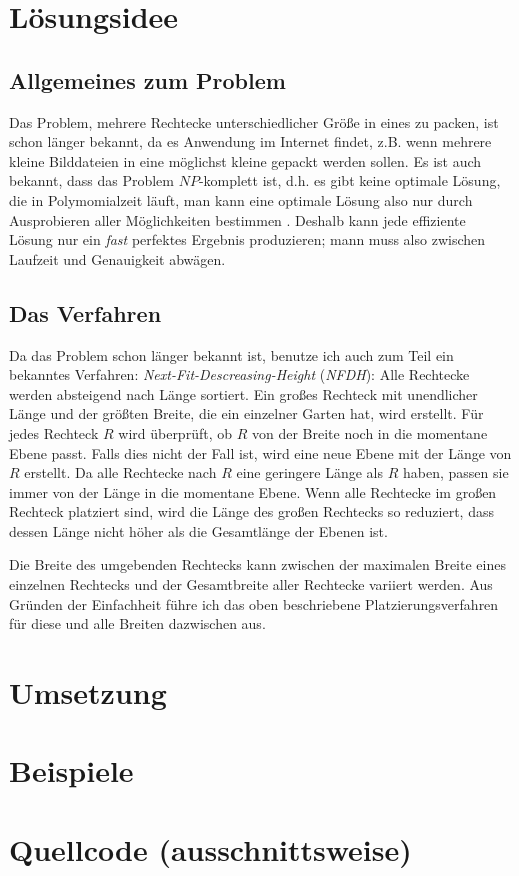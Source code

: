 \documentclass[a4paper,10pt,ngerman]{scrartcl}
\title{\Aufgabe}
\author{\Name\\Team-ID: \TeamId}
\date{\today}
\begin{document}
\maketitle
\tableofcontents
\clearpage


\section{Lösungsidee} 

\subsection{Allgemeines zum Problem}
Das Problem, mehrere Rechtecke unterschiedlicher Größe in eines zu packen, ist schon länger bekannt, da es Anwendung im Internet findet, z.B. wenn mehrere kleine Bilddateien in eine möglichst kleine gepackt werden sollen. Es ist auch bekannt, dass das Problem $NP$-komplett ist, d.h. es gibt keine optimale Lösung, die in Polymomialzeit läuft, man kann eine optimale Lösung also nur durch Ausprobieren aller Möglichkeiten bestimmen \cite{korf}. Deshalb kann jede effiziente Lösung nur ein \textit{fast} perfektes Ergebnis produzieren; mann muss also zwischen Laufzeit und Genauigkeit abwägen.

\subsection{Das Verfahren}

Da das Problem schon länger bekannt ist, benutze ich auch zum Teil ein bekanntes Verfahren: \textit{Next-Fit-Descreasing-Height} (\textit{NFDH}): Alle Rechtecke werden absteigend nach Länge sortiert. Ein großes Rechteck mit unendlicher Länge und der größten Breite, die ein einzelner Garten hat, wird erstellt. Für jedes Rechteck $R$ wird überprüft, ob $R$ von der Breite noch in die momentane Ebene passt. Falls dies nicht der Fall ist, wird eine neue Ebene mit der Länge von $R$ erstellt. Da alle Rechtecke nach $R$ eine geringere Länge als $R$ haben, passen sie immer von der Länge in die momentane Ebene. Wenn alle Rechtecke im großen Rechteck platziert sind, wird die Länge des großen Rechtecks so reduziert, dass dessen Länge nicht höher als die Gesamtlänge der Ebenen ist.

Die Breite des umgebenden Rechtecks kann zwischen der maximalen Breite eines einzelnen Rechtecks und der Gesamtbreite aller Rechtecke variiert werden. Aus Gründen der Einfachheit führe ich das oben beschriebene Platzierungsverfahren für diese und alle Breiten dazwischen aus.

\section{Umsetzung}

\section{Beispiele}

\section{Quellcode (ausschnittsweise)}

\printbibliography 
\end{document}
